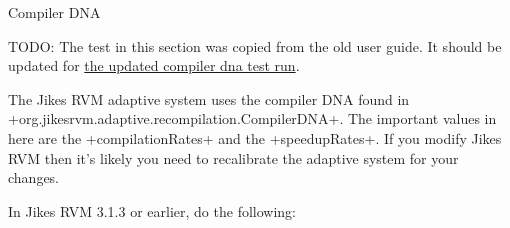 \begin{section}{Compiler DNA}
\label{sec:compilerdna}

TODO: The test in this section was copied from the old user guide. It should be updated for \href{https://xtenlang.atlassian.net/browse/RVM-584}{the updated compiler dna test run}.

The Jikes RVM adaptive system uses the compiler DNA found in \newline \spverb+org.jikesrvm.adaptive.recompilation.CompilerDNA+. The important values in here are the \spverb+compilationRates+ and the \spverb+speedupRates+. If you modify Jikes RVM then it's likely you need to recalibrate the adaptive system for your changes.

In Jikes RVM 3.1.3 or earlier, do the following:


\end{section}

